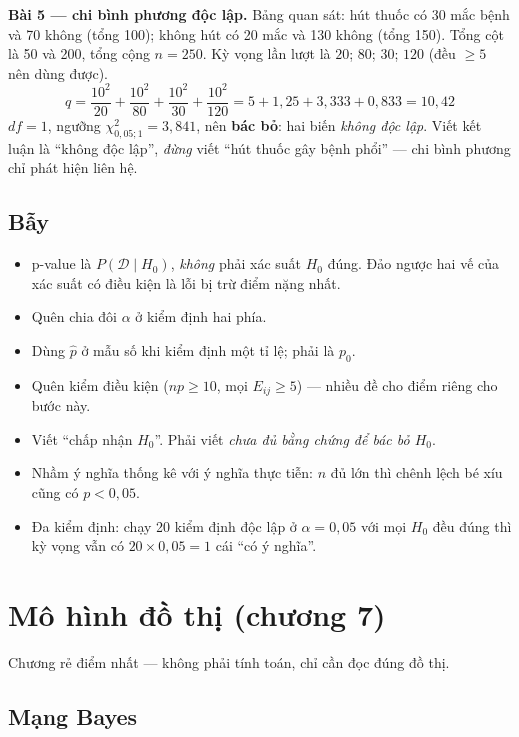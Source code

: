 \documentclass[11pt]{article}
\begin{document}
\textbf{Bài 5 --- chi bình phương độc lập.} Bảng quan sát: hút thuốc có 30 mắc
bệnh và 70 không (tổng 100); không hút có 20 mắc và 130 không (tổng 150). Tổng
cột là 50 và 200, tổng cộng $n=250$.
Kỳ vọng lần lượt là $20$; $80$; $30$; $120$ (đều $\ge 5$ nên dùng được).
\[
q = \frac{10^2}{20}+\frac{10^2}{80}+\frac{10^2}{30}+\frac{10^2}{120}
  = 5 + 1{,}25 + 3{,}333 + 0{,}833 = 10{,}42
\]
$df = 1$, ngưỡng $\chi^2_{0{,}05;1} = 3{,}841$, nên \textbf{bác bỏ}: hai biến
\emph{không độc lập}. Viết kết luận là ``không độc lập'', \emph{đừng} viết ``hút
thuốc gây bệnh phổi'' --- chi bình phương chỉ phát hiện liên hệ.

\subsection*{Bẫy}

\begin{itemize}
\item p-value là $P(\mathcal{D} \mid H_0)$, \emph{không} phải xác suất $H_0$ đúng.
      Đảo ngược hai vế của xác suất có điều kiện là lỗi bị trừ điểm nặng nhất.
\item Quên chia đôi $\alpha$ ở kiểm định hai phía.
\item Dùng $\hat p$ ở mẫu số khi kiểm định một tỉ lệ; phải là $p_0$.
\item Quên kiểm điều kiện ($np \ge 10$, mọi $E_{ij} \ge 5$) --- nhiều đề cho điểm
      riêng cho bước này.
\item Viết ``chấp nhận $H_0$''. Phải viết \emph{chưa đủ bằng chứng để bác bỏ $H_0$}.
\item Nhầm ý nghĩa thống kê với ý nghĩa thực tiễn: $n$ đủ lớn thì chênh lệch bé
      xíu cũng có $p<0{,}05$.
\item Đa kiểm định: chạy 20 kiểm định độc lập ở $\alpha = 0{,}05$ với mọi $H_0$
      đều đúng thì kỳ vọng vẫn có $20 \times 0{,}05 = 1$ cái ``có ý nghĩa''.
\end{itemize}

\section{Mô hình đồ thị (chương 7)}\label{sec:dothi}

Chương rẻ điểm nhất --- không phải tính toán, chỉ cần đọc đúng đồ thị.

\subsection*{Mạng Bayes}
\end{document}
